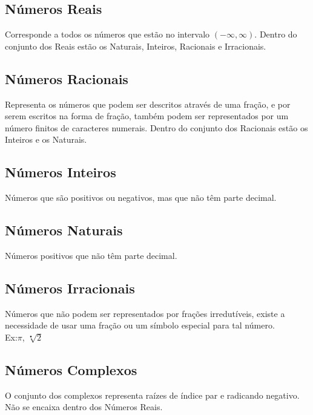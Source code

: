 \documentclass[•]{article}
\begin{document}
		\subsection{Números Reais}
			Corresponde a todos os números que estão no intervalo $(-\infty,\infty)$. Dentro do conjunto dos Reais estão os Naturais, Inteiros, Racionais e Irracionais.
		\subsection{Números Racionais}
			Representa os números que podem ser descritos através de uma fração, e por serem escritos na forma de fração, também podem ser representados por um número finitos de caracteres numerais. Dentro do conjunto dos Racionais estão os Inteiros e os Naturais.
		\subsection{Números Inteiros}
			Números que são positivos ou negativos, mas que não têm parte decimal.
		\subsection{Números Naturais}
			Números positivos que não têm parte decimal.
		\subsection{Números Irracionais}
			Números que não podem ser representados por frações irredutíveis, existe a necessidade de usar uma fração ou um símbolo especial para tal número.\\
			Ex:$\pi$, $\sqrt[•]{2}$
		\subsection{Números Complexos}
			O conjunto dos complexos representa raízes de índice par e radicando negativo. Não se encaixa dentro dos Números Reais.
\end{document}
